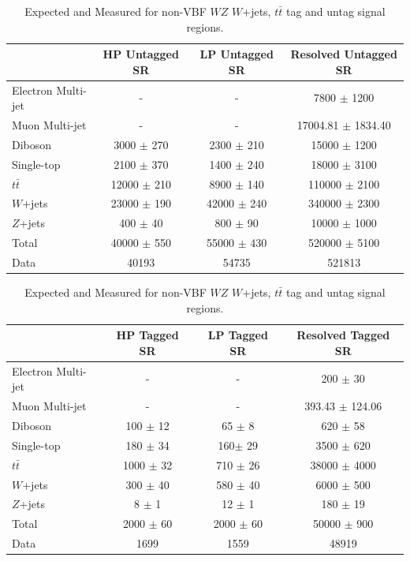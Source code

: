 \begin{table}
\begin{tabular}{|l|c|c|c|}
\hline
	  &	 HP Untagged SR &	 LP Untagged SR &	Resolved Untagged SR \\\hline 
	Electron Multi-jet &	- &	- &	7800 $\pm$ 1200 \\\hline 
	Muon Multi-jet &	- &	- &	17004.81 $\pm$ 1834.40 \\\hline 
	Diboson &	3000 $\pm$ 270 &	2300 $\pm$ 210 &	15000 $\pm$ 1200 \\\hline 
	Single-top &	2100 $\pm$ 370 &	1400 $\pm$ 240 &	18000 $\pm$ 3100\\\hline 
	$t\bar{t}$ &	12000 $\pm$ 210 &	8900 $\pm$ 140 &	110000 $\pm$ 2100 \\\hline 
	$W$+jets &	23000 $\pm$ 190&	42000 $\pm$ 240 &	340000 $\pm$ 2300 \\\hline 
	$Z$+jets &	400 $\pm$ 40 &	800 $\pm$ 90 &	10000 $\pm$ 1000 \\\hline 
	Total &	40000 $\pm$ 550 &	55000 $\pm$ 430 &	520000 $\pm$ 5100 \\\hline 
	Data &	40193 &	54735 &	521813 \\\hline 
\end{tabular}

\begin{tabular}{|l|c|c|c|}
\hline
	  &	 HP Tagged SR &	 LP Tagged SR &	Resolved Tagged SR \\\hline 
	Electron Multi-jet &	- &	- &	200 $\pm$ 30 \\\hline 
	Muon Multi-jet &	- &	- &	393.43 $\pm$ 124.06 \\\hline 
	Diboson &	100 $\pm$ 12 &	65 $\pm$ 8 &	620 $\pm$ 58 \\\hline 
	Single-top &	180 $\pm$ 34 &	160$\pm$ 29 &	3500 $\pm$ 620 \\\hline 
	$t\bar{t}$ &	1000 $\pm$ 32 &	710 $\pm$ 26 &	38000 $\pm$ 4000 \\\hline 
	$W$+jets &	300 $\pm$ 40 &	580 $\pm$ 40 &	6000 $\pm$ 500 \\\hline 
	$Z$+jets &	8 $\pm$ 1 &	12 $\pm$ 1 &	180 $\pm$ 19 \\\hline 
	Total &	2000 $\pm$ 60 &	2000 $\pm$ 60 &	50000 $\pm$ 900 \\\hline 
	Data &	1699 &	1559 &	48919 \\\hline 
\end{tabular}
\caption{Expected and Measured for non-VBF $WZ$ $W$+jets, $t\bar{t}$ tag and untag signal regions.}
\label{tbl:hvtwz_yields_tcr}
\end{table}

